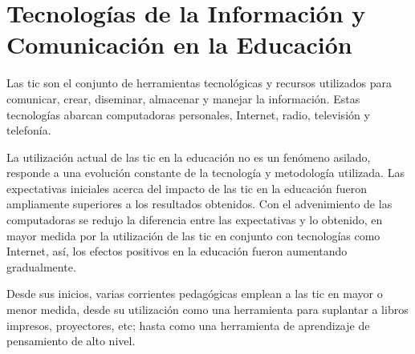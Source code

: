 \chapter[TIC's en la Educación]{Tecnologías de la Información y Comunicación en
    la Educación}
\label{chap:tics}


Las \Gls{tic} son el conjunto de herramientas tecnológicas y recursos utilizados
para comunicar, crear, diseminar, almacenar y manejar la
información\cite{unesco:ict}. Estas tecnologías abarcan computadoras personales,
Internet, radio, televisión y telefonía\cite{tinio:ict}.

La utilización actual de las \Gls{tic} en la educación no es un fenómeno
asilado, responde a una evolución constante de la tecnología y metodología
utilizada\cite{egenfeldt2007third}. Las expectativas iniciales acerca del
impacto de las \Gls{tic} en la educación fueron ampliamente superiores a los
resultados obtenidos\cite{unesco:ict}. Con el advenimiento de las computadoras
se redujo la diferencia entre las expectativas y lo obtenido, en mayor medida
por la utilización de las \Gls{tic} en conjunto con tecnologías como Internet,
así, los efectos positivos en la educación fueron aumentando
gradualmente\cite{unesco:ict}.

Desde sus inicios, varias corrientes pedagógicas emplean a las \gls{tic} en
mayor o menor medida, desde su utilización como una herramienta para suplantar a
libros impresos, proyectores, etc\cite{nanjappa2003constructing}; hasta como una
herramienta de aprendizaje de pensamiento de alto
nivel\cite{egenfeldt2007third,white:ict,nanjappa2003constructing}.

